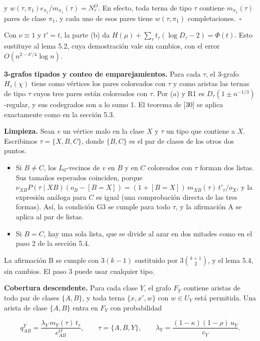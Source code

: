 \documentclass[spanish,11pt,a4paper]{article}
\providecommand{\tightlist}{\setlength{\itemsep}{0pt}\setlength{\parskip}{0pt}}
\begin{document}
y \(w(\tau,\pi_1)e_{\pi_1}/m_{\pi_1}(\tau)=N^O_\tau\). En efecto, toda terna de tipo \(\tau\) contiene \(m_{\pi_1}(\tau)\) pares de clase \(\pi_1\), y cada uno de esos pares tiene \(w(\tau,\pi_1)\) completaciones.~\(\square\)

Con \(\nu\equiv1\) y \(t'=t\), la parte (b) da \(H(\mu)+\sum_\tau t_\tau(\log D_\tau-2)=\Phi(t)\). Esto sustituye al lema 5.2, cuya demostración vale sin cambios, con el error \(O(n^{2-\delta'/4}\log n)\).

\textbf{3-grafos tipados y conteo de emparejamientos.} Para cada \(\tau\), el 3-grafo \(H_\tau(\chi)\) tiene como vértices los pares coloreados con \(\tau\) y como aristas las ternas de tipo \(\tau\) cuyos tres pares están coloreados con \(\tau\). Por (a) y R1 es \(D_\tau(1\pm n^{-1/3})\)-regular, y sus codegrados son a lo sumo 1. El teorema de {[}30{]} se aplica exactamente como en la sección 5.3.

\textbf{Limpieza.} Sean \(v\) un vértice malo en la clase \(X\) y \(\tau\) un tipo que contiene a \(X\). Escribimos \(\tau=\{X,B,C\}\), donde \(\{B,C\}\) es el par de clases de los otros dos puntos.

\begin{itemize}
\tightlist
\item
  Si \(B\ne C\), los \(L_0\)-vecinos de \(v\) en \(B\) y en \(C\) coloreados con \(\tau\) forman dos listas. Sus tamaños esperados coinciden, porque \(\nu_{XB}P(\tau\mid XB)(o_B-[B=X])=(1+[B=X])\,m_{XB}(\tau)\,t'_\tau/o_X\), y la expresión análoga para \(C\) es igual (una comprobación directa de las tres formas). Así, la condición G3 se cumple para todo \(\tau\), y la afirmación A se aplica al par de listas.
\item
  Si \(B=C\), hay una sola lista, que se divide al azar en dos mitades como en el paso 2 de la sección 5.4.
\end{itemize}

La afirmación B se cumple con \(3(k-1)\) sustituido por \(3\binom{k+1}{2}\), y el lema 5.4, sin cambios. El paso 3 puede usar cualquier tipo.

\textbf{Cobertura descendente.} Para cada clase \(Y\), el grafo \(F_Y\) contiene aristas de todo par de clases \(\{A,B\}\), y toda terna \(\{x,x',w\}\) con \(w\in U_Y\) está permitida. Una arista de clase \(\{A,B\}\) entra en \(F_Y\) con probabilidad

\nopagebreak[4]
\[q^Y_{AB}=\frac{\lambda_Y\,m_Y(\tau)\,t_\tau}{e^O_{AB}},\qquad\tau=\{A,B,Y\},\qquad\lambda_Y=\frac{(1-\kappa)(1-\rho)\,u_Y}{c_Y}.\]
\end{document}
